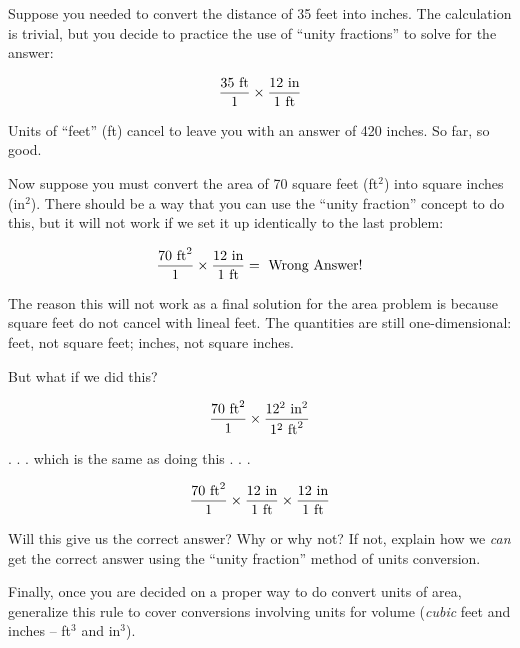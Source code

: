 

Suppose you needed to convert the distance of 35 feet into inches.  The calculation is trivial, but you decide to practice the use of ``unity fractions'' to solve for the answer:

$${{35 \hbox{ ft}} \over {1}} \times {{12 \hbox{ in}} \over {1 \hbox{ ft}}}$$

Units of ``feet'' (ft) cancel to leave you with an answer of 420 inches.  So far, so good.

\vskip 10pt

Now suppose you must convert the area of 70 square feet (ft$^{2}$) into square inches (in$^{2}$).  There should be a way that you can use the ``unity fraction'' concept to do this, but it will not work if we set it up identically to the last problem:

$${{70 \hbox{ ft}^2} \over {1}} \times {{12 \hbox{ in}} \over {1 \hbox{ ft}}} = \hbox{ Wrong Answer!}$$

The reason this will not work as a final solution for the area problem is because square feet do not cancel with lineal feet.  The quantities are still one-dimensional: feet, not square feet; inches, not square inches.

But what if we did this?

$${{70 \hbox{ ft}^2} \over {1}} \times {{12^2 \hbox{ in}^2} \over {1^2 \hbox{ ft}^2}}$$

. . . which is the same as doing this . . .

$${{70 \hbox{ ft}^2} \over {1}} \times {{12 \hbox{ in}} \over {1 \hbox{ ft}}} \times {{12 \hbox{ in}} \over {1 \hbox{ ft}}}$$

Will this give us the correct answer?  Why or why not?  If not, explain how we {\it can} get the correct answer using the ``unity fraction'' method of units conversion.

Finally, once you are decided on a proper way to do convert units of area, generalize this rule to cover conversions involving units for volume ({\it cubic} feet and inches -- ft$^{3}$ and in$^{3}$).







